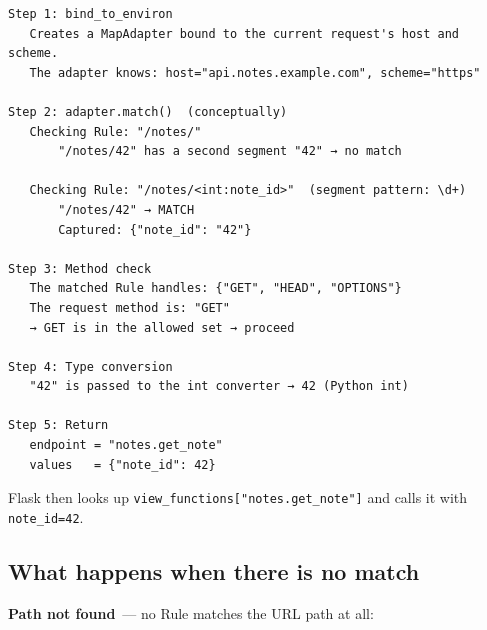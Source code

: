 \begin{outputbox}
\begin{Verbatim}[fontsize=\codesize, breaklines, breakanywhere, breaksymbolleft={\tiny\textcolor{muted}{$\hookrightarrow$}}]
Step 1: bind_to_environ
   Creates a MapAdapter bound to the current request's host and scheme.
   The adapter knows: host="api.notes.example.com", scheme="https"

Step 2: adapter.match()  (conceptually)
   Checking Rule: "/notes/"
       "/notes/42" has a second segment "42" → no match

   Checking Rule: "/notes/<int:note_id>"  (segment pattern: \d+)
       "/notes/42" → MATCH
       Captured: {"note_id": "42"}

Step 3: Method check
   The matched Rule handles: {"GET", "HEAD", "OPTIONS"}
   The request method is: "GET"
   → GET is in the allowed set → proceed

Step 4: Type conversion
   "42" is passed to the int converter → 42 (Python int)

Step 5: Return
   endpoint = "notes.get_note"
   values   = {"note_id": 42}
\end{Verbatim}
\end{outputbox}

\noindent{}Flask then looks up \texttt{view\_}\allowbreak{}\texttt{functions{[}"notes.}\allowbreak{}\texttt{get\_}\allowbreak{}\texttt{note"{]}} and calls it with \texttt{note\_id=42}.

\subsection*{What happens when there is no match}\label{32-routing:what-happens-when-there-is-no-match}

\textbf{Path not found}~--- no Rule matches the URL path at all:

\begin{codebox}[short]

\begin{Shaded}
\begin{Highlighting}[]

\end{Highlighting}
\end{Shaded}

\end{codebox}

